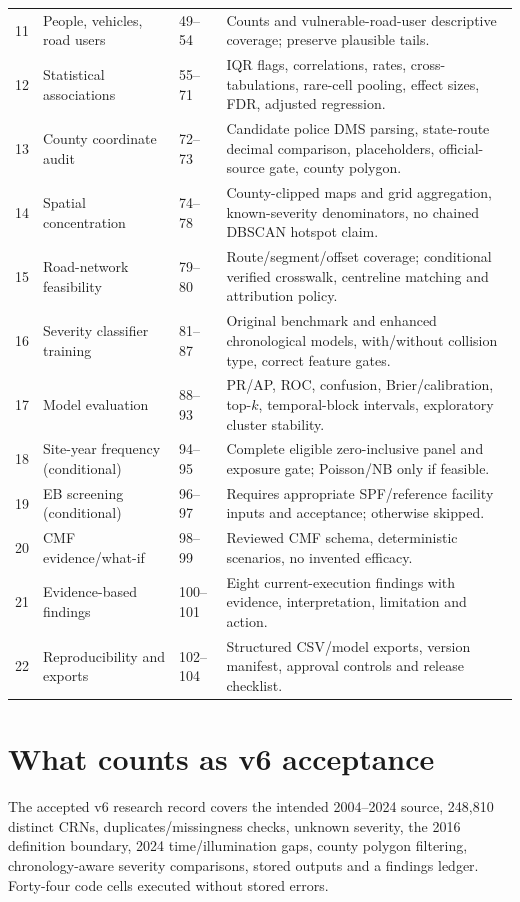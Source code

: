 \documentclass[11pt,a4paper,openany]{report}
\begin{document}
\begin{longtable}{@{}L{9mm}L{48mm}L{17mm}L{67mm}@{}}
11 & People, vehicles, road users & 49--54 & Counts and vulnerable-road-user descriptive coverage; preserve plausible tails.\\
12 & Statistical associations & 55--71 & IQR flags, correlations, rates, cross-tabulations, rare-cell pooling, effect sizes, FDR, adjusted regression.\\
13 & County coordinate audit & 72--73 & Candidate police DMS parsing, state-route decimal comparison, placeholders, official-source gate, county polygon.\\
14 & Spatial concentration & 74--78 & County-clipped maps and grid aggregation, known-severity denominators, no chained DBSCAN hotspot claim.\\
15 & Road-network feasibility & 79--80 & Route/segment/offset coverage; conditional verified crosswalk, centreline matching and attribution policy.\\
16 & Severity classifier training & 81--87 & Original benchmark and enhanced chronological models, with/without collision type, correct feature gates.\\
17 & Model evaluation & 88--93 & PR/AP, ROC, confusion, Brier/calibration, top-$k$, temporal-block intervals, exploratory cluster stability.\\
18 & Site-year frequency (conditional) & 94--95 & Complete eligible zero-inclusive panel and exposure gate; Poisson/NB only if feasible.\\
19 & EB screening (conditional) & 96--97 & Requires appropriate SPF/reference facility inputs and acceptance; otherwise skipped.\\
20 & CMF evidence/what-if & 98--99 & Reviewed CMF schema, deterministic scenarios, no invented efficacy.\\
21 & Evidence-based findings & 100--101 & Eight current-execution findings with evidence, interpretation, limitation and action.\\
22 & Reproducibility and exports & 102--104 & Structured CSV/model exports, version manifest, approval controls and release checklist.\\
\bottomrule\end{longtable}
\normalsize

\section{What counts as v6 acceptance}
The accepted v6 research record covers the intended 2004--2024 source, 248,810 distinct CRNs, duplicates/missingness checks, unknown severity, the 2016 definition boundary, 2024 time/illumination gaps, county polygon filtering, chronology-aware severity comparisons, stored outputs and a findings ledger. Forty-four code cells executed without stored errors.
\end{document}
